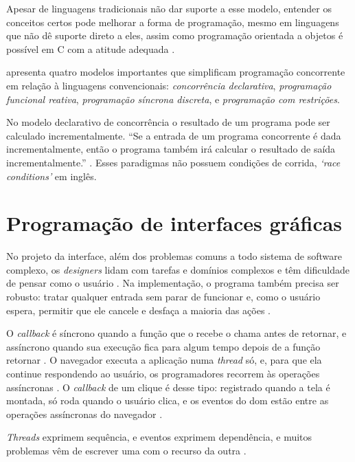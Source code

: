 Apesar de linguagens tradicionais não dar suporte a esse modelo, entender os
conceitos certos pode melhorar a forma de programação, mesmo em linguagens que
não dê suporte direto a eles, assim como programação orientada a objetos é
possível em C com a atitude adequada \cite{vanroy2009}.

\textcite{vanroy2009} apresenta quatro modelos importantes que simplificam
programação concorrente em relação à linguagens convencionais: \emph{concorrência
declarativa}, \emph{programação funcional reativa}, \emph{programação síncrona
discreta}, e \emph{programação com restrições}.

No modelo declarativo de concorrência o resultado de um programa pode ser
calculado incrementalmente.
“Se a entrada de um programa concorrente é dada incrementalmente, então o
programa também irá calcular o resultado de saída incrementalmente.”
\cite[p. 238; tradução nossa]{vanroy2004}.
Esses paradigmas não possuem condições de corrida, \emph{‘race conditions’} em
inglês.
\section{Programação de interfaces gráficas}
\label{sec:programacao-de-interfaces-graficas}

No projeto da interface, além dos problemas comuns a todo sistema de
software complexo, os \emph{designers} lidam com tarefas e domínios complexos e
têm dificuldade de pensar como o usuário \cite[p. 75]{myers1994}.
Na implementação, o programa também precisa ser robusto: tratar qualquer
entrada sem parar de funcionar e, como o usuário espera, permitir que ele
cancele e desfaça a maioria das ações \cite[p. 75, 79 e 80]{myers1994}.

O \emph{callback} é síncrono quando a função que o recebe o chama antes de
retornar, e assíncrono quando sua execução fica para algum tempo depois de a
função retornar \cite[p. 2]{gallaba2015}.
O navegador executa a aplicação numa \emph{thread} só, e, para que ela continue
respondendo ao usuário, os programadores recorrem às operações assíncronas
\cite[p. 368-369]{alimadadi2014}.
O \emph{callback} de um clique é desse tipo: registrado quando a tela é montada,
só roda quando o usuário clica, e os eventos do \gls{dom} estão entre as
operações assíncronas do navegador \cite[p. 5]{gallaba2015}.

\emph{Threads} exprimem sequência, e eventos exprimem dependência, e muitos
problemas vêm de escrever uma com o recurso da outra
\cite[p. 16]{blackheath2016}.

